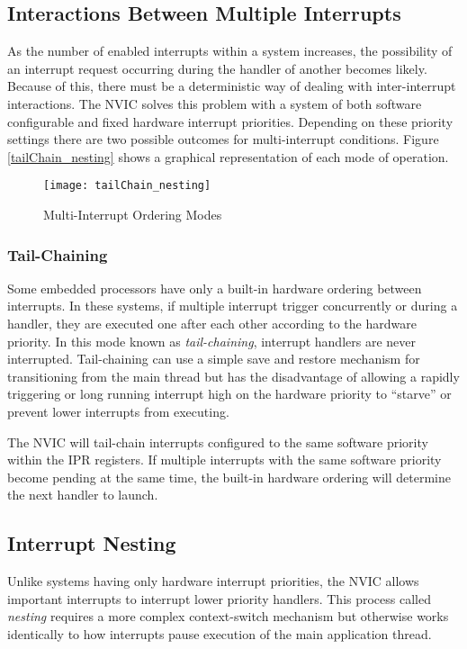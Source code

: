 \documentclass[11pt,fleqn]{book} %
\begin{document}
\subsection{Interactions Between Multiple Interrupts}
As the number of enabled interrupts within a system increases, the possibility of an interrupt request occurring during the handler of another becomes likely. Because of this, there must be a deterministic way of dealing with inter-interrupt interactions. The NVIC solves this problem with a system of both software configurable and fixed hardware interrupt priorities. Depending on these priority settings there are two possible outcomes for multi-interrupt conditions. Figure \vref{tailChain_nesting} shows a graphical representation of each mode of operation.

\begin{figure}[]
    \centering\texttt{[image: tailChain\_nesting]}
    \caption{Multi-Interrupt Ordering Modes}
    \label{tailChain_nesting}
\end{figure}

\subsubsection{Tail-Chaining}
Some embedded processors have only a built-in hardware ordering between interrupts. In these systems, if multiple interrupt trigger concurrently or during a handler, they are executed one after each other according to the hardware priority. In this mode known as \textit{tail-chaining}, interrupt handlers are never interrupted. Tail-chaining can use a simple save and restore mechanism for transitioning from the main thread but has the disadvantage of allowing a rapidly triggering or long running interrupt high on the hardware priority to ``starve'' or prevent lower interrupts from executing. 

The NVIC will tail-chain interrupts configured to the same software priority within the IPR registers. If multiple interrupts with the same software priority become pending at the same time, the built-in hardware ordering will determine the next handler to launch.

\subsection{Interrupt Nesting}
Unlike systems having only hardware interrupt priorities, the NVIC allows important interrupts to interrupt lower priority handlers. This process called \textit{nesting} requires a more complex context-switch mechanism but otherwise works identically to how interrupts pause execution of the main application thread. 
\end{document}
